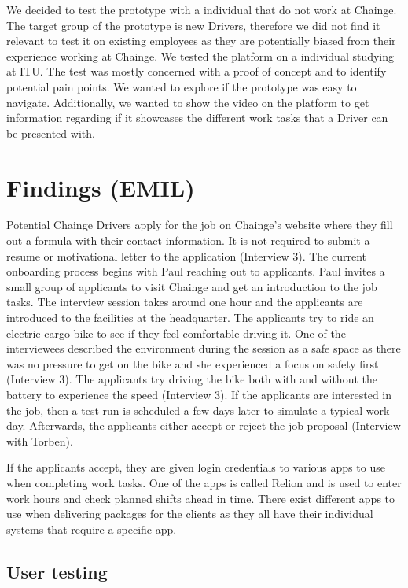 We decided to test the prototype with a individual that do not work at
Chainge. The target group of the prototype is new Drivers, therefore we
did not find it relevant to test it on existing employees as they are
potentially biased from their experience working at Chainge. We tested
the platform on a individual studying at ITU. The test was mostly
concerned with a proof of concept and to identify potential pain points.
We wanted to explore if the prototype was easy to navigate.
Additionally, we wanted to show the video on the platform to get
information regarding if it showcases the different work tasks that a
Driver can be presented with.

\hypertarget{sec:findings}{%
\section{Findings (EMIL)}\label{sec:findings}}

Potential Chainge Drivers apply for the job on Chainge's website where
they fill out a formula with their contact information. It is not
required to submit a resume or motivational letter to the application
(Interview 3). The current onboarding process begins with Paul reaching
out to applicants. Paul invites a small group of applicants to visit
Chainge and get an introduction to the job tasks. The interview session
takes around one hour and the applicants are introduced to the
facilities at the headquarter. The applicants try to ride an electric
cargo bike to see if they feel comfortable driving it. One of the
interviewees described the environment during the session as a safe
space as there was no pressure to get on the bike and she experienced a
focus on safety first (Interview 3). The applicants try driving the bike
both with and without the battery to experience the speed (Interview 3).
If the applicants are interested in the job, then a test run is
scheduled a few days later to simulate a typical work day. Afterwards,
the applicants either accept or reject the job proposal (Interview with
Torben).

If the applicants accept, they are given login credentials to various
apps to use when completing work tasks. One of the apps is called Relion
and is used to enter work hours and check planned shifts ahead in time.
There exist different apps to use when delivering packages for the
clients as they all have their individual systems that require a
specific app.

\hypertarget{sec:user_testing}{%
\subsection{User testing}\label{sec:user_testing}}

